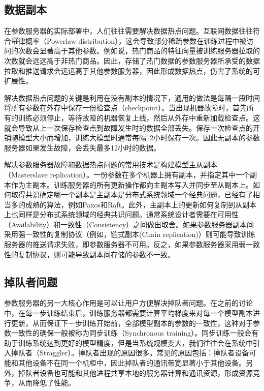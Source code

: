 \documentclass[letterpaper,10pt,english]{sphinxmanual}
\begin{document}
\subsection{数据副本}
\label{\detokenize{chapter_distributed_training/parameter_servers:id3}}
\sphinxAtStartPar
在参数服务器的实际部署中，人们往往需要解决数据热点问题。互联网数据往往符合幂律概率（Power\sphinxhyphen{}law
distribution），这会导致部分稀疏参数在训练过程中被访问的次数会显著高于其他参数。例如说，热门商品的特征向量被训练服务器拉取的次数就会远远高于非热门商品。因此，存储了热门数据的参数服务器所承受的数据拉取和推送请求会远远高于其他参数服务器，因此形成数据热点，伤害了系统的可扩展性。

\sphinxAtStartPar
解决数据热点问题的关键是利用在没有副本的情况下，通用的做法是每隔一段时间将所有参数在外存中保存一份检查点（checkpoint）。当出现机器故障时，首先所有的训练必须停止，等待故障的机器恢复上线，然后从外存中重新加载检查点。这就会导致从上一次保存检查点到故障发生时的数据全部丢失。保存一次检查点的开销随模型大小而增加，训练大模型时通常每隔1\sphinxhyphen{}2小时保存一次。因此无副本的参数服务器如果发生故障，会丢失最多1\sphinxhyphen{}2小时的数据。

\sphinxAtStartPar
解决参数服务器故障和数据热点问题的常用技术是构建模型主从副本（Master\sphinxhyphen{}slave
replication）。一份参数在多个机器上拥有副本，并指定其中一个副本作为主副本。训练服务器的所有更新操作都向主副本写入并同步至从副本上。如何取得共识确定哪一个副本是主副本是分布式系统领域一个经典问题，已经有了相当多的成熟的算法，例如Paxos和Raft。此外，主副本上的更新如何复制到从副本上也同样是分布式系统领域的经典共识问题。通常系统设计者需要在可用性（Availability）和一致性（Consistency）之间做出取舍。如果参数服务器副本间采用强一致性的复制协议（例如，链式副本(Chain
replication)）则可能导致训练服务器的推送请求失败，即参数服务器不可用。反之，如果参数服务器采用弱一致性的复制协议，则可能导致副本间存储的参数不一致。


\subsection{掉队者问题}
\label{\detokenize{chapter_distributed_training/parameter_servers:id4}}
\sphinxAtStartPar
参数服务器的另一大核心作用是可以让用户方便解决掉队者问题。在之前的讨论中，在每一步训练结束后，训练服务器都需要计算平均梯度来对每一个模型副本进行更新，从而保证下一步训练开始前，全部模型副本的参数的一致性，这种对于参数一致性的确保一般被称为同步训练（Synchronous
training）。同步训练一般会有助于训练系统达到更好的模型精度，但是当系统规模变大，我们往往会在系统中引入掉队者（Straggler）。掉队者出现的原因很多。常见的原因包括：掉队者设备可能和其他设备不在同一个机柜中，因此掉队者的通讯带宽显著小于其他设备。另外，掉队者设备也可能和其他进程共享本地的服务器计算和通讯资源，形成资源竞争，从而降低了性能。
\end{document}
